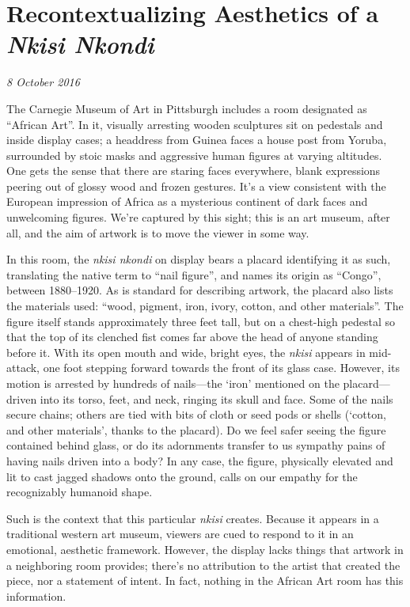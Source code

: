 \section{Recontextualizing Aesthetics of a \textit{Nkisi Nkondi}}

\textit{8 October 2016}

The Carnegie Museum of Art in Pittsburgh includes a room designated as ``African
Art''. In it, visually arresting wooden sculptures sit on pedestals and
inside display cases; a headdress from Guinea faces a house post from Yoruba,
surrounded by stoic masks and aggressive human figures at varying altitudes. One gets
the sense that there are staring faces everywhere, blank expressions peering out
of glossy wood and frozen gestures. It's a view consistent with the European
impression of Africa as a mysterious continent of dark faces and unwelcoming
figures. We're captured by this sight; this is an art museum, after all, and the
aim of artwork is to move the viewer in some way.

In this room, the \textit{nkisi nkondi} on display bears a placard identifying it as such,
translating the native term to ``nail figure'', and names its origin as
``Congo'', between 1880--1920. As is standard for describing artwork, the placard also lists the
materials used: ``wood, pigment, iron, ivory, cotton, and other materials''. The
figure itself stands approximately three feet tall, but on a chest-high pedestal
so that the top of its clenched fist comes far above the head of anyone standing
before it. With its open mouth and wide, bright eyes, the \textit{nkisi} appears
in mid-attack, one foot stepping forward towards the front of its glass case.
However, its motion is arrested by hundreds of nails---the `iron' mentioned on the
placard---driven into its torso, feet, and neck, ringing its skull and face. Some of the
nails secure chains; others are tied with bits of cloth or seed pods or shells
(`cotton, and other materials', thanks to the placard). Do we feel safer seeing
the figure contained behind glass, or do its adornments transfer to us sympathy
pains of having nails driven into a body? In any case, the figure, physically
elevated and lit to cast jagged shadows onto the ground, calls on our empathy
for the recognizably humanoid shape.

Such is the context that this particular \textit{nkisi} creates. Because it
appears in a traditional western art museum, viewers are cued to respond to it
in an emotional, aesthetic framework. However, the display lacks things that artwork
in a neighboring room provides; there's no attribution to the artist that created
the piece, nor a statement of intent. In fact, nothing in the African Art room
has this information.

